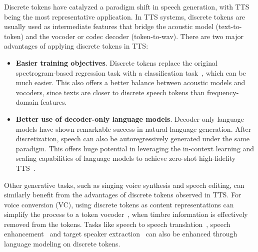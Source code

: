Discrete tokens have catalyzed a paradigm shift in speech generation, with TTS being the most representative application.
In TTS systems, discrete tokens are usually used as intermediate features that bridge the acoustic model (text-to-token) and the vocoder or codec decoder (token-to-wav).
There are two major advantages of applying discrete tokens in TTS:
\begin{itemize}
    \item \textbf{Easier training objectives}. Discrete tokens replace the original spectrogram-based regression task with a classification task~\cite{VQTTS}, which can be much easier.
    This also offers a better balance between acoustic models and vocoders, since texts are closer to discrete speech tokens than frequency-domain features.
    \item \textbf{Better use of decoder-only language models}. 
    Decoder-only language models have shown remarkable success in natural language generation.
    After discretization, speech can also be autoregressively generated under the same paradigm. 
    This offers huge potential in leveraging the in-context learning and scaling capabilities of language models to achieve zero-shot high-fidelity TTS~\cite{valle}. 
\end{itemize}
Other generative tasks, such as singing voice synthesis and speech editing, can similarly benefit from the advantages of discrete tokens observed in TTS.
For voice conversion (VC), using discrete tokens as content representations can simplify the process to a token vocoder~\cite{guo2024vec2wav}, when timbre information is effectively removed from the tokens.
Tasks like speech to speech translation~\cite{lee2022direct,zhang2021uwspeech}, speech enhancement~\cite{wang2024selm,liu2024joint} and target speaker extraction~\cite{tang2024tselm} can also be enhanced through language modeling on discrete tokens.

